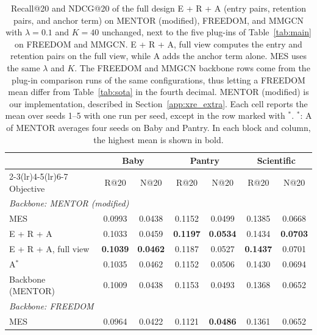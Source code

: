 \begin{table}[!t]\caption{Recall@20 and NDCG@20 of the full design E + R + A (entry pairs, retention pairs, and anchor term) on MENTOR (modified), FREEDOM, and MMGCN with $\lambda=0.1$ and $K=40$ unchanged, next to the five plug-ins of Table~\ref{tab:main} on FREEDOM and MMGCN. E + R + A, full view computes the entry and retention pairs on the full view, while A adds the anchor term alone. MES uses the same $\lambda$ and $K$. The FREEDOM and MMGCN backbone rows come from the plug-in comparison runs of the same configurations, thus letting a FREEDOM mean differ from Table~\ref{tab:sota} in the fourth decimal. MENTOR (modified) is our implementation, described in Section~\ref{app:xre_extra}. Each cell reports the mean over seeds 1--5 with one run per seed, except in the row marked with $^{\ast}$. $^{\ast}$: A of MENTOR averages four seeds on Baby and Pantry. In each block and column, the highest mean is shown in bold.}
\label{tab:transfer}
\centering
\footnotesize
\setlength{\tabcolsep}{2.5pt}
\begin{tabular}{lcccccc}
\toprule
 & \multicolumn{2}{c}{Baby} & \multicolumn{2}{c}{Pantry} & \multicolumn{2}{c}{Scientific} \\
\cmidrule(lr){2-3}\cmidrule(lr){4-5}\cmidrule(lr){6-7}
Objective & R@20 & N@20 & R@20 & N@20 & R@20 & N@20 \\
\midrule
\multicolumn{7}{l}{\textit{Backbone: MENTOR (modified)~\cite{xu2024mentor}}} \\
MES & 0.0993 & 0.0438 & 0.1152 & 0.0499 & 0.1385 & 0.0668 \\
E + R + A & 0.1033 & 0.0459 & \textbf{0.1197} & \textbf{0.0534} & 0.1434 & \textbf{0.0703} \\
E + R + A, full view & \textbf{0.1039} & \textbf{0.0462} & 0.1187 & 0.0527 & \textbf{0.1437} & 0.0701 \\
A$^{\ast}$ & 0.1035 & 0.0462 & 0.1152 & 0.0506 & 0.1430 & 0.0694 \\
Backbone (MENTOR) & 0.1009 & 0.0438 & 0.1153 & 0.0493 & 0.1368 & 0.0652 \\
\midrule
\multicolumn{7}{l}{\textit{Backbone: FREEDOM~\cite{zhou2023freedom}}} \\
MES & 0.0964 & 0.0422 & 0.1121 & \textbf{0.0486} & 0.1361 & 0.0652 \\

\end{tabular}
\end{table}
